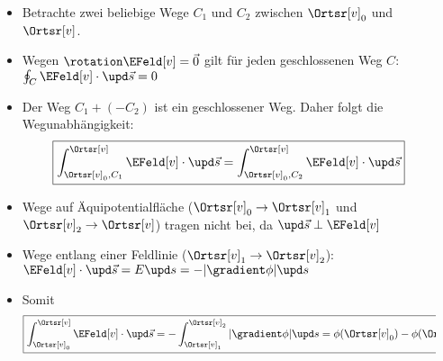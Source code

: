 \begin{frame}
\begin{columns}[T]
\begin{column}{.4\linewidth}
{}
\end{column}
\begin{column}{.6\linewidth}
  \begin{itemize}[<+->]
    \item Betrachte zwei beliebige Wege $C_1$ und $C_2$ zwischen
      $\Ortsr[v]_0$ und $\Ortsr[v]$.
      \item Wegen $\rotation \EFeld[v] =\vec{0} $ gilt für jeden geschlossenen
        Weg $C$:
        $
        \oint_C \EFeld[v]\cdot\upd\vec{s} = 0 
        $
        \item Der Weg $C_1 + (-C_2)$ ist ein geschlossener Weg. Daher
          folgt die \alert{Wegunabhängigkeit}:
          $$
       \boxed{\int_{\Ortsr[v]_0, C_1}^{\Ortsr[v]} \EFeld[v]\cdot\upd\vec{s} =        \int_{\Ortsr[v]_0, C_2}^{\Ortsr[v]} \EFeld[v]\cdot\upd\vec{s}} 
       $$
       \item Wege auf Äquipotentialfläche ($\Ortsr[v]_0\to\Ortsr[v]_1$ und
         $\Ortsr[v]_2\to\Ortsr[v]$) tragen nicht bei, da $\upd\vec{s}
         \perp \EFeld[v]$
         \item Wege entlang einer Feldlinie ($\Ortsr[v]_1\to\Ortsr[v]_2$):
           $\EFeld[v]\cdot\upd\vec{s} = E \upd s = -|\gradient\phi| \upd s$
         \item Somit
           $$
             \boxed{\int_{\Ortsr[v]_0}^{\Ortsr[v]} \EFeld[v]\cdot\upd\vec{s} = 
                                                                       -
                                                                       \int_{\Ortsr[v]_1}^{\Ortsr[v]_2}
                                                                       |\gradient\phi|\upd
                                                                       s
                                                                       =
                                                                       \phi(\Ortsr[v]_0)
                                                                       - \phi(\Ortsr[v])}
             $$
    \end{itemize}
\end{column}
\end{columns}
\end{frame}

